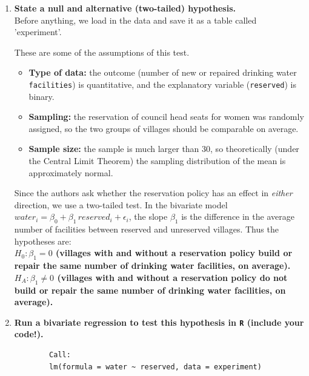 \documentclass[12pt,letterpaper]{article}
\begin{document}
\begin{enumerate}
	
	\item [(a)] \textbf{State a null and alternative (two-tailed) hypothesis.}\\
	
	Before anything, we load in the data and save it as a table called 'experiment'.
		
	
	These are some of the assumptions of this test.
	\begin{itemize}
		\item \textbf{Type of data:} the outcome (number of new or repaired drinking water \texttt{facilities}) is quantitative, and the explanatory variable (\texttt{reserved}) is binary.
		\item \textbf{Sampling:} the reservation of council head seats for women was randomly assigned, so the two groups of villages should be comparable on average.
		\item \textbf{Sample size:} the sample is much larger than 30, so theoretically (under the Central Limit Theorem) the sampling distribution of the mean is approximately normal.
	\end{itemize}
	\vspace{.3cm}
	
	\noindent Since the authors ask whether the reservation policy has an effect in \emph{either} direction, we use a two-tailed test. In the bivariate model $water_i = \beta_0 + \beta_1\,reserved_i + \epsilon_i$, the slope $\beta_1$ is the difference in the average number of facilities between reserved and unreserved villages. Thus the hypotheses are:\\
	
	\noindent \textbf{$H_0: \beta_1 = 0$ \quad (villages with and without a reservation policy build or repair the same number of drinking water facilities, on average).\\
	$H_A: \beta_1 \neq 0$ \quad (villages with and without a reservation policy do not build or repair the same number of drinking water facilities, on average).\\}
	\vspace{.5cm}
	
	\item [(b)] \textbf{Run a bivariate regression to test this hypothesis in \texttt{R} (include your code!).}
	
	\begin{verbatim}
		Call:
		lm(formula = water ~ reserved, data = experiment)
		

\end{verbatim}
\end{enumerate}
\end{document}
